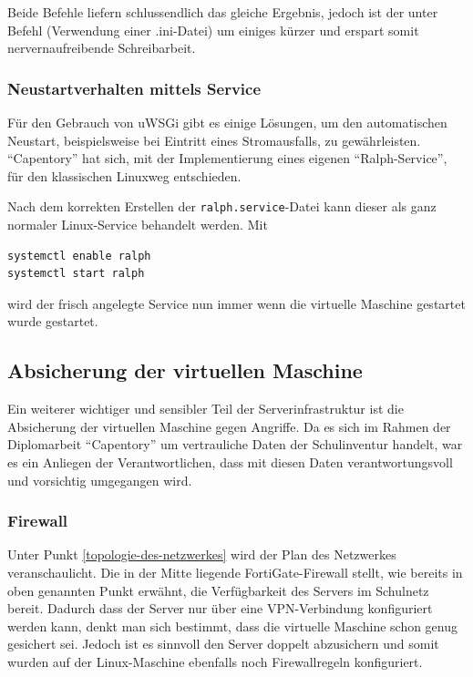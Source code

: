 Beide Befehle liefern schlussendlich das gleiche Ergebnis, jedoch ist
der unter Befehl (Verwendung einer .ini-Datei) um einiges kürzer und
erspart somit nervernaufreibende Schreibarbeit.

\hypertarget{neustartverhalten-mittels-service}{%
\subsubsection{Neustartverhalten mittels
Service}\label{neustartverhalten-mittels-service}}

Für den Gebrauch von uWSGi gibt es einige Lösungen, um den automatischen
Neustart, beispielsweise bei Eintritt eines Stromausfalls, zu
gewährleisten. ``Capentory'' hat sich, mit der Implementierung eines
eigenen ``Ralph-Service'', für den klassischen Linuxweg entschieden.

Nach dem korrekten Erstellen der \texttt{ralph.service}-Datei kann
dieser als ganz normaler Linux-Service behandelt werden. Mit

\begin{verbatim}
systemctl enable ralph
systemctl start ralph
\end{verbatim}

wird der frisch angelegte Service nun immer wenn die virtuelle Maschine
gestartet wurde gestartet.

\hypertarget{absicherung-der-virtuellen-maschine}{%
\subsection{Absicherung der virtuellen
Maschine}\label{absicherung-der-virtuellen-maschine}}

Ein weiterer wichtiger und sensibler Teil der Serverinfrastruktur ist
die Absicherung der virtuellen Maschine gegen Angriffe. Da es sich im
Rahmen der Diplomarbeit ``Capentory'' um vertrauliche Daten der
Schulinventur handelt, war es ein Anliegen der Verantwortlichen, dass
mit diesen Daten verantwortungsvoll und vorsichtig umgegangen wird.

\hypertarget{firewall}{%
\subsubsection{Firewall}\label{firewall}}

Unter Punkt \ref{topologie-des-netzwerkes} wird der Plan des Netzwerkes
veranschaulicht. Die in der Mitte liegende FortiGate-Firewall stellt,
wie bereits in oben genannten Punkt erwähnt, die Verfügbarkeit des
Servers im Schulnetz bereit. Dadurch dass der Server nur über eine
VPN-Verbindung konfiguriert werden kann, denkt man sich bestimmt, dass
die virtuelle Maschine schon genug gesichert sei. Jedoch ist es sinnvoll
den Server doppelt abzusichern und somit wurden auf der Linux-Maschine
ebenfalls noch Firewallregeln konfiguriert.

